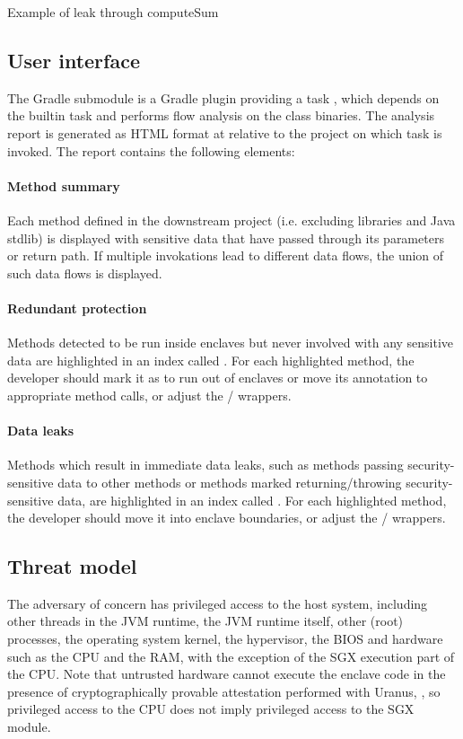 {Example of leak through computeSum}

\subsection{User interface}
The  Gradle submodule
is a Gradle plugin providing a task ,
which depends on the  builtin task
and performs flow analysis on the class binaries.
The analysis report is generated as HTML format at
relative to the project on which task is invoked.
The report contains the following elements:

\paragraph{Method summary}
Each method defined in the downstream project (i.e. excluding libraries and Java stdlib)
is displayed with sensitive data that have passed through its parameters or return path.
If multiple invokations lead to different data flows,
the union of such data flows is displayed.

\paragraph{Redundant protection}
Methods detected to be run inside enclaves but never involved with any sensitive data
are highlighted in an index called .
For each highlighted method, the developer
should mark it as  to run out of enclaves
or move its  annotation to appropriate method calls,
or adjust the / wrappers.

\paragraph{Data leaks}
Methods which result in immediate data leaks,
such as methods passing security-sensitive data to other  methods
or methods marked  returning/throwing security-sensitive data,
are highlighted in an index called .
For each highlighted method, the developer
should move it into enclave boundaries,
or adjust the / wrappers.

\subsection{Threat model}
The adversary of concern has privileged access to the host system,
including other threads in the JVM runtime, the JVM runtime itself,
other (root) processes, the operating system kernel,
the hypervisor, the BIOS and hardware such as the CPU and the RAM,
with the exception of the SGX execution part of the CPU.
Note that untrusted hardware cannot execute the enclave code
in the presence of cryptographically provable attestation performed with Uranus,
\cite{uranus},
so privileged access to the CPU does not imply privileged access to the SGX module.

